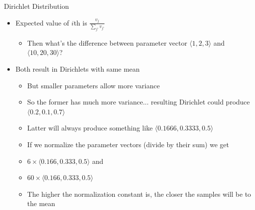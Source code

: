 \documentclass[aspectratio=169]{beamer}
\begin{document}
\begin{frame}{Dirichlet Distribution}
\begin{itemize}
	\item Expected value of $i$th is $\frac{v_j}{\sum_{j'} v_{j'}}$
	\begin{itemize}
	\item Then what's the difference between parameter vector $\langle 1, 2, 3 \rangle$
	and $\langle 10, 20, 30 \rangle$?
	\end{itemize}
	\item Both result in Dirichlets with same mean
	\begin{itemize}
	\item But smaller parameters allow more variance
	\item So the former has much more variance... resulting Dirichlet could produce $\langle 0.2, 0.1, 0.7 \rangle$
	\item Latter will always produce something like $\langle 0.1666, 0.3333, 0.5 \rangle$
	\item If we normalize the parameter vectors (divide by their sum) we get 
	\item[] $6 \times \langle 0.166, 0.333, 0.5 \rangle$ and
	\item[] $60 \times \langle 0.166, 0.333, 0.5 \rangle$
	\item The higher the normalization constant is, the closer the samples will be to the mean
	\end{itemize}
\end{itemize}
	\end{frame}
\end{document}
